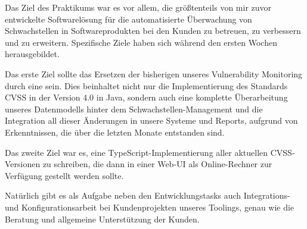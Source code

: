 Das Ziel des Praktikums war es vor allem, die größtenteils von mir zuvor entwickelte Softwarelösung für die automatisierte Überwachung von Schwachstellen in Softwareprodukten bei den Kunden zu betreuen, zu verbessern und zu erweitern.
Spezifische Ziele haben sich während den ersten Wochen herausgebildet.

Das erste Ziel sollte das Ersetzen der bisherigen  unseres Vulnerability Monitoring durch eine  sein.
Dies beinhaltet nicht nur die Implementierung des Standards CVSS in der Version 4.0 in Java, sondern auch eine komplette Überarbeitung unseres Datenmodells hinter dem Schwachstellen-Management und die Integration all dieser Änderungen in unsere Systeme und Reports, aufgrund von Erkenntnissen, die über die letzten Monate entstanden sind.

Das zweite Ziel war es, eine TypeScript-Implementierung aller aktuellen CVSS-Versionen zu schreiben, die dann in einer Web-UI als Online-Rechner zur Verfügung gestellt werden sollte.

Natürlich gibt es als Aufgabe neben den Entwicklungstasks auch Integrations- und Konfigurationsarbeit bei Kundenprojekten unseres Toolings, genau wie die Beratung und allgemeine Unterstützung der Kunden.
